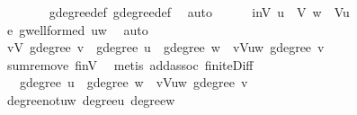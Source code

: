 \begin{isabellebody}
\ \ \ \ \ \ \isamarkupfalse%
\ g{\isacharprime}{\kern0pt}{\isachardot}{\kern0pt}degree{\isacharunderscore}{\kern0pt}def\ g{\isachardot}{\kern0pt}degree{\isacharunderscore}{\kern0pt}def\ \isamarkupfalse%
\ auto\isanewline
\ \ \ \ \isamarkupfalse%
\ inV{\isacharcolon}{\kern0pt}\ {\isachardoublequoteopen}u\ {\isasymin}\ V{\isachardoublequoteclose}\ {\isachardoublequoteopen}w\ {\isasymin}\ V{\isacharminus}{\kern0pt}{\isacharbraceleft}{\kern0pt}u{\isacharbraceright}{\kern0pt}{\isachardoublequoteclose}\ \isamarkupfalse%
\ e\ g{\isacharprime}{\kern0pt}{\isachardot}{\kern0pt}wellformed\ {\isacartoucheopen}u{\isasymnoteq}w{\isacartoucheclose}\ \isamarkupfalse%
\ auto\isanewline
\ \ \ \ \isamarkupfalse%
\ \isamarkupfalse%
\ {\isachardoublequoteopen}{\isacharparenleft}{\kern0pt}{\isasymSum}v{\isasymin}V{\isachardot}{\kern0pt}\ g{\isacharprime}{\kern0pt}{\isachardot}{\kern0pt}degree\ v{\isacharparenright}{\kern0pt}\ {\isacharequal}{\kern0pt}\ g{\isacharprime}{\kern0pt}{\isachardot}{\kern0pt}degree\ u\ {\isacharplus}{\kern0pt}\ g{\isacharprime}{\kern0pt}{\isachardot}{\kern0pt}degree\ w\ {\isacharplus}{\kern0pt}\ {\isacharparenleft}{\kern0pt}{\isasymSum}v{\isasymin}V{\isacharminus}{\kern0pt}{\isacharbraceleft}{\kern0pt}u{\isacharbraceright}{\kern0pt}{\isacharminus}{\kern0pt}{\isacharbraceleft}{\kern0pt}w{\isacharbraceright}{\kern0pt}{\isachardot}{\kern0pt}\ g{\isacharprime}{\kern0pt}{\isachardot}{\kern0pt}degree\ v{\isacharparenright}{\kern0pt}{\isachardoublequoteclose}\isanewline
\ \ \ \ \ \ \isamarkupfalse%
\ sum{\isachardot}{\kern0pt}remove\ finV\ \isamarkupfalse%
\ {\isacharparenleft}{\kern0pt}metis\ add{\isachardot}{\kern0pt}assoc\ finite{\isacharunderscore}{\kern0pt}Diff{\isacharparenright}{\kern0pt}\isanewline
\ \ \ \ \isamarkupfalse%
\ \isamarkupfalse%
\ {\isachardoublequoteopen}{\isasymdots}\ {\isacharequal}{\kern0pt}\ g{\isachardot}{\kern0pt}degree\ u\ {\isacharplus}{\kern0pt}\ g{\isachardot}{\kern0pt}degree\ w\ {\isacharplus}{\kern0pt}\ {\isacharparenleft}{\kern0pt}{\isasymSum}v{\isasymin}V{\isacharminus}{\kern0pt}{\isacharbraceleft}{\kern0pt}u{\isacharbraceright}{\kern0pt}{\isacharminus}{\kern0pt}{\isacharbraceleft}{\kern0pt}w{\isacharbraceright}{\kern0pt}{\isachardot}{\kern0pt}\ g{\isachardot}{\kern0pt}degree\ v{\isacharparenright}{\kern0pt}\ {\isacharplus}{\kern0pt}\ {}{\isachardoublequoteclose}\isanewline
\ \ \ \ \ \ \isamarkupfalse%
\ degree{\isacharunderscore}{\kern0pt}not{\isacharunderscore}{\kern0pt}u{\isacharunderscore}{\kern0pt}w\ degree{\isacharunderscore}{\kern0pt}u\ degree{\isacharunderscore}{\kern0pt}w\ \isamarkupfalse%

\end{isabellebody}
